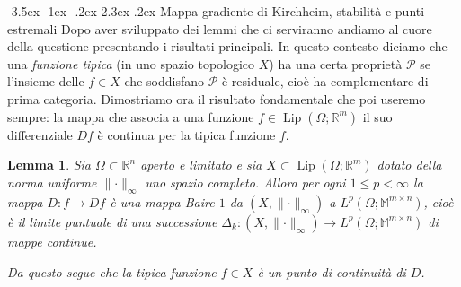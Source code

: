 \documentclass[a4paper,11pt]{book}
\makeatletter
\theoremstyle{plain}
\newtheorem{lemma}[teo]{Lemma}
\theoremstyle{definition}
\theoremstyle{remark}
\newcommand{\R}{\mathbb{R}}
\newcommand{\M}{\mathbb{M}}
\newcommand{\norm}[1]{\lVert#1\rVert}
\DeclareMathOperator{\Lip}{Lip}
\renewcommand\section{\@startsection {section}{1}{\z@}%
                                   {-3.5ex \@plus -1ex \@minus -.2ex}%
                                   {2.3ex \@plus.2ex}%
                                   {\normalfont\Large\bfseries}}
\makeatother
\begin{document}
\section{Mappa gradiente di Kirchheim, stabilità e punti estremali}
Dopo aver sviluppato dei lemmi che ci serviranno andiamo al cuore della questione presentando i risultati principali. In questo contesto diciamo che una \textit{funzione tipica} (in uno spazio topologico $X$) ha una certa proprietà $\mathcal{P}$ se l'insieme delle $f\in X$ che soddisfano $\mathcal{P}$ è residuale, cioè ha complementare di prima categoria. Dimostriamo ora il risultato fondamentale che poi useremo sempre: la mappa che associa a una funzione $f\in\Lip(\Omega;\R^m)$ il suo differenziale $Df$ è continua per la tipica funzione $f$.


\begin{lemma}\label{lemma:4}
	Sia $\Omega\subset \R^n$ aperto e limitato e sia $X\subset \Lip(\Omega;\R^m)$ dotato della norma uniforme $\norm{\cdot}_{\infty}$ uno spazio completo. Allora per ogni $1\leq p<\infty$ la mappa $D:f\to Df$ è una mappa Baire-$1$ da $(X,\norm{\cdot}_{\infty})$ a $L^p(\Omega;\M^{m\times n})$, cioè è il limite puntuale di una successione $\Delta_k:(X,\norm{\cdot}_{\infty})\to L^p(\Omega;\M^{m\times n})$ di mappe continue.
	
	Da questo segue che la tipica funzione $f\in X$ è un punto di continuità di $D$.
\end{lemma}
\end{document}
